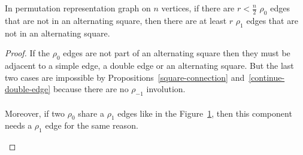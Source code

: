 \begin{lemma}
  \label{rho0atEnd}
  In permutation representation graph on $n$ vertices, if there are $r < \frac{n}{2}$ $\rho_0$ edges that are not in an alternating square, then there are at least $r$ $\rho_1$ edges that are not in an alternating square.
\end{lemma}

\begin{proof}
  If the $\rho_0$ edges are not part of an alternating square then they must be adjacent to a simple edge, a double edge or an alternating square. But the last two cases are impossible by Propositions~\ref{square-connection} and~\ref{continue-double-edge} because there are no $\rho_{-1}$ involution.

  \paragraph{}
  Moreover, if two $\rho_0$ share a $\rho_1$ edges like in the Figure~\ref{rho0Fig}, then this component needs a $\rho_1$ edge for the same reason.

  \begin{figure}[H]
    \begin{center}
      \caption{}
      \label{rho0Fig}
    \end{center}
  \end{figure}
\end{proof}
